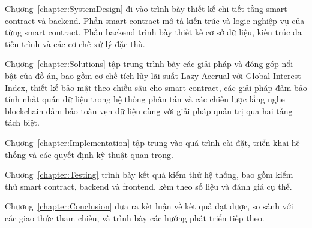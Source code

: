 \documentclass[../DoAn.tex]{subfiles}
\begin{document}
Chương~\ref{chapter:SystemDesign} đi vào trình bày thiết kế chi tiết tầng smart contract và backend. Phần smart contract mô tả kiến trúc và logic nghiệp vụ của từng smart contract. Phần backend trình bày thiết kế cơ sở dữ liệu, kiến trúc đa tiến trình và các cơ chế xử lý đặc thù.

Chương~\ref{chapter:Solutions} tập trung trình bày các giải pháp và đóng góp nổi bật của đồ án, bao gồm cơ chế tích lũy lãi suất Lazy Accrual với Global Interest Index, thiết kế bảo mật theo chiều sâu cho smart contract, các giải pháp đảm bảo tính nhất quán dữ liệu trong hệ thống phân tán và các chiến lược lắng nghe blockchain đảm bảo toàn vẹn dữ liệu cùng với giải pháp quản trị qua hai tầng tách biệt.

Chương~\ref{chapter:Implementation} tập trung vào quá trình cài đặt, triển khai hệ thống và các quyết định kỹ thuật quan trọng.

Chương~\ref{chapter:Testing} trình bày kết quả kiểm thử hệ thống, bao gồm kiểm thử smart contract, backend và frontend, kèm theo số liệu và đánh giá cụ thể.

Chương~\ref{chapter:Conclusion} đưa ra kết luận về kết quả đạt được, so sánh với các giao thức tham chiếu, và trình bày các hướng phát triển tiếp theo.
\end{document}
